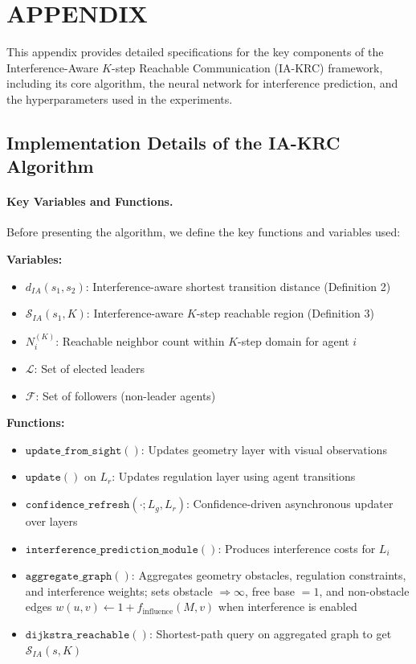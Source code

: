 \onecolumn
\raggedbottom
\setcounter{secnumdepth}{2}
\renewcommand\thesubsection{A.\arabic{subsection}}
\renewcommand\thesubsubsection{A.\arabic{subsection}.\arabic{subsubsection}}

\section*{APPENDIX}

This appendix provides detailed specifications for the key components of the Interference-Aware $K$-step Reachable Communication (IA-KRC) framework, including its core algorithm, the neural network for interference prediction, and the hyperparameters used in the experiments.

\subsection{Implementation Details of the IA-KRC Algorithm}

\paragraph{Key Variables and Functions.} Before presenting the algorithm, we define the key functions and variables used:

\textbf{Variables:}

\begin{itemize}
\item $d_{IA}(s_1, s_2)$: Interference-aware shortest transition distance (Definition 2)
\item $\mathcal{S}_{IA}(s_1, K)$: Interference-aware $K$-step reachable region (Definition 3)
\item $N_i^{(K)}$: Reachable neighbor count within $K$-step domain for agent $i$
\item $\mathcal{L}$: Set of elected leaders
\item $\mathcal{F}$: Set of followers (non-leader agents)
\end{itemize}

\textbf{Functions:}
\begin{itemize}
\item $\texttt{update\_from\_sight}()$: Updates geometry layer with visual observations
\item $\texttt{update}()$ on $L_r$: Updates regulation layer using agent transitions
\item $\texttt{confidence\_refresh}(\cdot; L_g, L_r)$: Confidence-driven asynchronous updater over layers
\item $\texttt{interference\_prediction\_module}()$: Produces interference costs for $L_i$
\item $\texttt{aggregate\_graph}()$: Aggregates geometry obstacles, regulation constraints, and interference weights; sets obstacle $\Rightarrow \infty$, free base $=1$, and non-obstacle edges $w(u,v) \leftarrow 1 + f_{\text{influence}}(M,v)$ when interference is enabled
\item $\texttt{dijkstra\_reachable}()$: Shortest-path query on aggregated graph to get $\mathcal{S}_{IA}(s,K)$
\end{itemize}

